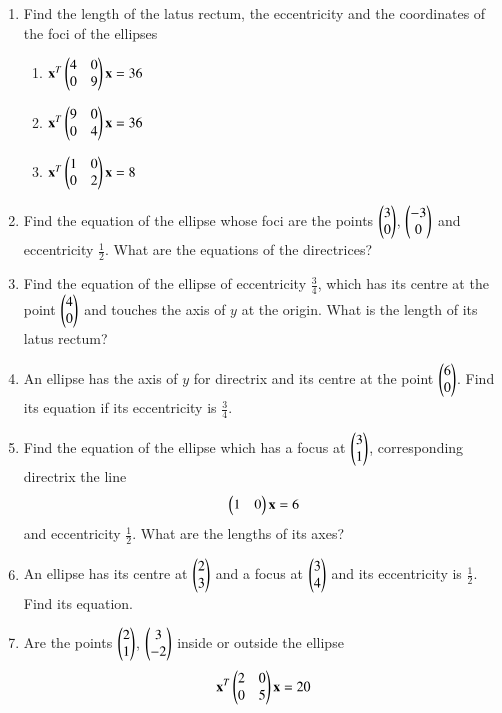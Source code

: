 \renewcommand{\theequation}{\theenumi}
\begin{enumerate}[label=\arabic*.,ref=\thesubsection.\theenumi]
\item Find the length of the latus rectum, the eccentricity and the coordinates of the
foci of the ellipses
\begin{enumerate}
\item 
$
\mathbf{x}^T\begin{pmatrix}4 & 0\\0& 9\end{pmatrix}\mathbf{x} = 36
$
\item 
$
\mathbf{x}^T\begin{pmatrix}9 & 0\\0& 4\end{pmatrix}\mathbf{x} = 36
$
\item
$
\mathbf{x}^T\begin{pmatrix}1 & 0\\0& 2\end{pmatrix}\mathbf{x} = 8
$
\end{enumerate}
\item Find the equation of the ellipse whose foci are the points $\begin{pmatrix}3\\0\end{pmatrix}$,  $\begin{pmatrix}-3\\0\end{pmatrix}$
and eccentricity $\frac{1}{2}$.  What are the equations of the directrices?
\item Find the equation of the ellipse of eccentricity $\frac{3}{4}$, which has its centre at the point $\begin{pmatrix}4\\0\end{pmatrix}$ and touches the axis of $y$ at the
origin.  What is the length of its latus rectum?
\item An ellipse has the axis of $y$ for directrix and its centre at the point $\begin{pmatrix}6\\0\end{pmatrix}$.   Find its 
equation if its eccentricity is $\frac{3}{4}$.
\item Find the equation of the ellipse which has a focus at $\begin{pmatrix}3\\1\end{pmatrix}$, corresponding directrix the line
\begin{align}
\begin{pmatrix}1 & 0\end{pmatrix}\mathbf{x} = 6
\end{align}
and
eccentricity $\frac{1}{2}$.  What are the lengths of its axes?
\item An ellipse has its centre at $\begin{pmatrix}2\\3\end{pmatrix}$ and a focus at $\begin{pmatrix}3\\4\end{pmatrix}$ and its eccentricity is $\frac{1}{2}$.  Find its equation.
\item Are the points $\begin{pmatrix}2\\1\end{pmatrix}$, $\begin{pmatrix}3\\-2\end{pmatrix}$ inside or outside the ellipse
\begin{align}
\vec{x}^T\myvec{2 & 0\\0& 5}\vec{x} = 20

\end{align}
\end{enumerate}
